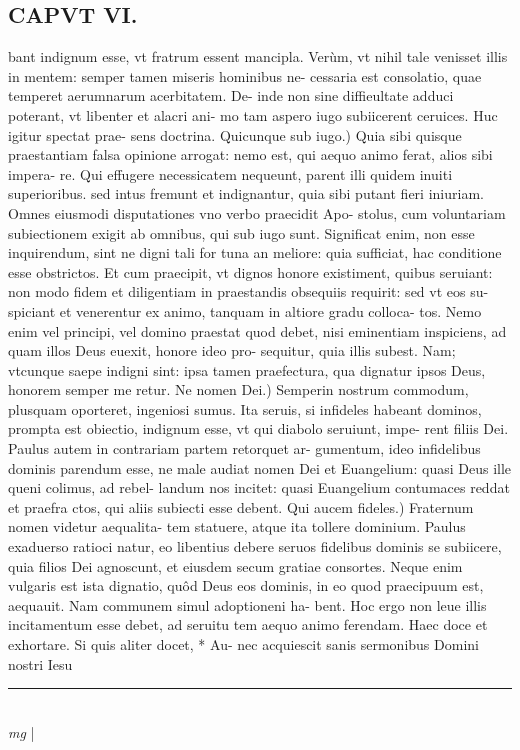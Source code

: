 \documentclass{article}
\begin{document}
\begin{pages}
\section*{CAPVT VI. }
\marginpar{[ p.73 ]}\pstart bant indignum esse, vt fratrum essent mancipla. Verùm, vt nihil tale venisset illis in mentem: semper tamen miseris hominibus ne- cessaria est consolatio, quae temperet aerumnarum acerbitatem. De- inde non sine diffieultate adduci poterant, vt libenter et alacri ani- mo tam aspero iugo subiicerent ceruices. Huc igitur spectat prae- sens doctrina.  \pend\pstart Quicunque sub iugo.) Quia sibi quisque praestantiam falsa opinione arrogat: nemo est, qui aequo animo ferat, alios sibi impera- re. Qui effugere necessicatem nequeunt, parent illi quidem inuiti superioribus. sed intus fremunt et indignantur, quia sibi putant fieri iniuriam. Omnes eiusmodi disputationes vno verbo praecidit Apo- stolus, cum voluntariam subiectionem exigit ab omnibus, qui sub iugo sunt. Significat enim, non esse inquirendum, sint ne digni tali for tuna an meliore: quia sufficiat, hac conditione esse obstrictos. Et cum praecipit, vt dignos honore existiment, quibus seruiant: non modo fidem et diligentiam in praestandis obsequiis requirit: sed vt eos su- spiciant et venerentur ex animo, tanquam in altiore gradu colloca- tos. Nemo enim vel principi, vel domino praestat quod debet, nisi eminentiam inspiciens, ad quam illos Deus euexit, honore ideo pro- sequitur, quia illis subest. Nam; vtcunque saepe indigni sint: ipsa tamen praefectura, qua dignatur ipsos Deus, honorem semper me retur.  \pend\pstart Ne nomen Dei.) Semperin nostrum commodum, plusquam oporteret, ingeniosi sumus. Ita seruis, si infideles habeant dominos, prompta est obiectio, indignum esse, vt qui diabolo seruiunt, impe- rent filiis Dei. Paulus autem in contrariam partem retorquet ar- gumentum, ideo infidelibus dominis parendum esse, ne male audiat nomen Dei et Euangelium: quasi Deus ille queni colimus, ad rebel- landum nos incitet: quasi Euangelium contumaces reddat et praefra ctos, qui aliis subiecti esse debent.  \pend\pstart Qui aucem fideles.) Fraternum nomen videtur aequalita- tem statuere, atque ita tollere dominium. Paulus exaduerso ratioci natur, eo libentius debere seruos fidelibus dominis se subiicere, quia filios Dei agnoscunt, et eiusdem secum gratiae consortes. Neque enim vulgaris est ista dignatio, quôd Deus eos dominis, in eo quod praecipuum est, aequauit. Nam communem simul adoptioneni ha- bent. Hoc ergo non leue illis incitamentum esse debet, ad seruitu tem aequo animo ferendam.  \pend\pstart Haec doce et exhortare. Si quis aliter docet, * Au- nec acquiescit sanis sermonibus Domini nostri Iesu  \pend
\vspace{0.5cm}\noindent
\vspace{0.2cm}\rule{1cm}{0.2pt}\\ 
\hspace{0.2cm}\textit{mg}
\footnotesize 
\normalsize| 

\end{pages}
\end{document}

